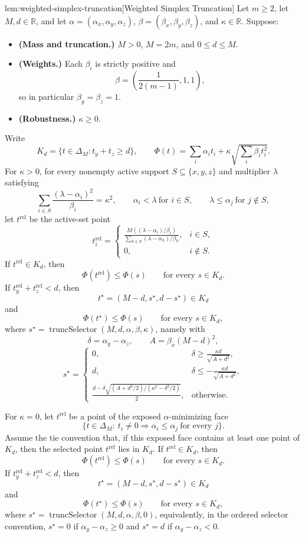 \begin{lemmav}{lem:weighted-simplex-truncation}[Weighted Simplex Truncation]
Let \(m\ge 2\), let \(M,d\in\mathbb R\), and let \(\alpha=(\alpha_x,\alpha_y,\alpha_z)\), \(\beta=(\beta_x,\beta_y,\beta_z)\), and \(\kappa\in\mathbb R\). Suppose:
\begin{itemize}
\item \textbf{(Mass and truncation.)} \(M>0\), \(M=2m\), and \(0\le d\le M\).
\item \textbf{(Weights.)} Each \(\beta_i\) is strictly positive and
\[
\beta=\left(\frac{1}{2(m-1)},1,1\right),
\]
so in particular \(\beta_y=\beta_z=1\).
\item \textbf{(Robustness.)} \(\kappa\ge 0\).
\end{itemize}
Write
\[
K_d=\{t\in\Delta_M:t_y+t_z\ge d\},
\qquad
\Phi(t)=\sum_i\alpha_i t_i+\kappa\sqrt{\sum_i\beta_i t_i^2}.
\]
For \(\kappa>0\), for every nonempty active support \(S\subseteq\{x,y,z\}\) and multiplier \(\lambda\) satisfying
\[
\sum_{i\in S}\frac{(\lambda-\alpha_i)^2}{\beta_i}=\kappa^2,\qquad
\alpha_i<\lambda\ \text{for }i\in S,\qquad
\lambda\le \alpha_j\ \text{for }j\notin S,
\]
let \(t^{\mathrm{rel}}\) be the active-set point
\[
t^{\mathrm{rel}}_i=
\begin{cases}
\displaystyle
\frac{M((\lambda-\alpha_i)/\beta_i)}
{\sum_{h\in S}(\lambda-\alpha_h)/\beta_h}, & i\in S,\\[1em]
0, & i\notin S .
\end{cases}
\]
If \(t^{\mathrm{rel}}\in K_d\), then
\[
\Phi(t^{\mathrm{rel}})\le \Phi(s)
\qquad\text{for every }s\in K_d.
\]
If \(t^{\mathrm{rel}}_y+t^{\mathrm{rel}}_z<d\), then
\[
t^\star=(M-d,s^\star,d-s^\star)\in K_d
\]
and
\[
\Phi(t^\star)\le \Phi(s)
\qquad\text{for every }s\in K_d,
\]
where \(s^\star=\operatorname{truncSelector}(M,d,\alpha,\beta,\kappa)\), namely with
\[
\delta=\alpha_y-\alpha_z,\qquad A=\beta_x(M-d)^2,
\]
\[
s^\star=
\begin{cases}
0, & \displaystyle \delta\ge \frac{\kappa d}{\sqrt{A+d^2}},\\[0.8em]
d, & \displaystyle \delta\le -\frac{\kappa d}{\sqrt{A+d^2}},\\[0.8em]
\displaystyle
\frac{d-\delta\sqrt{(A+d^2/2)/(\kappa^2-\delta^2/2)}}{2},
& \text{otherwise.}
\end{cases}
\]

For \(\kappa=0\), let \(t^{\mathrm{rel}}\) be a point of the exposed \(\alpha\)-minimizing face
\[
\{t\in\Delta_M:\ t_i\ne 0\Rightarrow \alpha_i\le \alpha_j\ \text{for every }j\}.
\]
Assume the tie convention that, if this exposed face contains at least one point of \(K_d\), then the selected point \(t^{\mathrm{rel}}\) lies in \(K_d\). If \(t^{\mathrm{rel}}\in K_d\), then
\[
\Phi(t^{\mathrm{rel}})\le \Phi(s)
\qquad\text{for every }s\in K_d.
\]
If \(t^{\mathrm{rel}}_y+t^{\mathrm{rel}}_z<d\), then
\[
t^\star=(M-d,s^\star,d-s^\star)\in K_d
\]
and
\[
\Phi(t^\star)\le \Phi(s)
\qquad\text{for every }s\in K_d,
\]
where \(s^\star=\operatorname{truncSelector}(M,d,\alpha,\beta,0)\), equivalently, in the ordered selector convention, \(s^\star=0\) if \(\alpha_y-\alpha_z\ge 0\) and \(s^\star=d\) if \(\alpha_y-\alpha_z<0\).
\end{lemmav}

